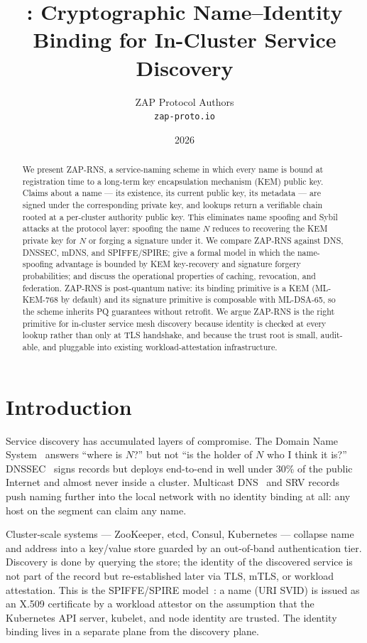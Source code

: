 \documentclass[11pt,a4paper]{article}
\title{\RNS: Cryptographic Name--Identity Binding for In-Cluster Service Discovery}
\author{ZAP Protocol Authors\\\texttt{zap-proto.io}}
\date{2026}
\theoremstyle{definition}
\theoremstyle{remark}
\newcommand{\RNS}{\textsc{ZAP-RNS}}
\begin{document}
\maketitle

\begin{abstract}
We present \RNS, a service-naming scheme in which every name is bound at
registration time to a long-term key encapsulation mechanism (KEM) public
key. Claims about a name --- its existence, its current public key, its
metadata --- are signed under the corresponding private key, and lookups
return a verifiable chain rooted at a per-cluster authority public key.
This eliminates name spoofing and Sybil attacks at the protocol layer:
spoofing the name $N$ reduces to recovering the KEM private key for $N$
or forging a signature under it. We compare \RNS{} against DNS, DNSSEC,
mDNS, and SPIFFE/SPIRE; give a formal model in which the
name-spoofing advantage is bounded by KEM key-recovery and signature
forgery probabilities; and discuss the operational properties of
caching, revocation, and federation. \RNS{} is post-quantum native: its
binding primitive is a KEM (ML-KEM-768 by default) and its signature
primitive is composable with ML-DSA-65, so the scheme inherits PQ
guarantees without retrofit. We argue \RNS{} is the right primitive for
in-cluster service mesh discovery because identity is checked at every
lookup rather than only at TLS handshake, and because the trust root is
small, audit-able, and pluggable into existing workload-attestation
infrastructure.
\end{abstract}

\section{Introduction}

Service discovery has accumulated layers of compromise. The Domain Name
System~\cite{rfc1035} answers ``where is $N$?'' but not ``is the holder
of $N$ who I think it is?'' DNSSEC~\cite{rfc4033} signs records but
deploys end-to-end in well under 30\% of the public Internet and almost
never inside a cluster. Multicast DNS~\cite{rfc6762} and SRV
records~\cite{rfc2782} push naming further into the local network with
no identity binding at all: any host on the segment can claim any name.

Cluster-scale systems --- ZooKeeper, etcd, Consul, Kubernetes ---
collapse name and address into a key/value store guarded by an out-of-band
authentication tier. Discovery is done by querying the store; the
identity of the discovered service is not part of the record but
re-established later via TLS, mTLS, or workload attestation. This is
the SPIFFE/SPIRE model~\cite{spiffe}: a name (URI SVID) is issued as
an X.509 certificate by a workload attestor on the assumption that the
Kubernetes API server, kubelet, and node identity are trusted. The
identity binding lives in a separate plane from the discovery plane.
\end{document}

